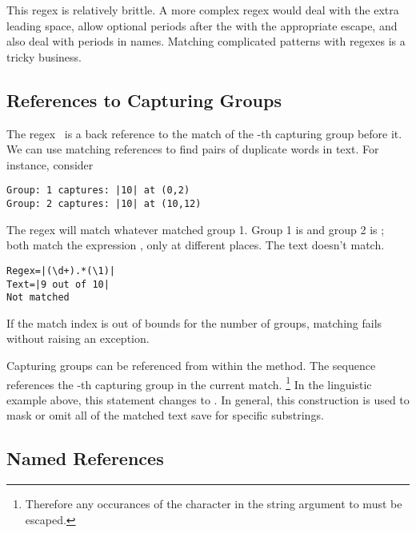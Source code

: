 This regex is relatively brittle.
A more complex regex would deal with the extra leading space, 
allow optional periods after the  with the
appropriate escape, and also deal with periods in names.
Matching complicated patterns with regexes is a tricky business.

\subsection{References to Capturing Groups}\label{section:regex-back-references}

The regex \, is a back reference to the match of
the -th capturing group before it.  We can use matching
references to find pairs of duplicate words in text.  For instance,
consider
%
\begin{verbatim}
Group: 1 captures: |10| at (0,2)
Group: 2 captures: |10| at (10,12)
\end{verbatim}
% 
The regex  will match whatever matched group 1.  
Group 1 is  and group 2 is ; both
match the expression , only at different places.
The text  doesn't match.
%
\begin{verbatim} 
Regex=|(\d+).*(\1)|
Text=|9 out of 10|
Not matched
\end{verbatim}
%
If the match index is out of bounds for the number of groups, matching
fails without raising an exception.

Capturing groups can be referenced from within the 
method.
The sequence  references the -th capturing group
in the current match.%
%
\footnote{Therefore any occurances of the character \stringmention{\$}
in the string argument to  must be escaped.}
%
%
In the linguistic example above, this statement changes
 to .
In general, this construction is used to mask or omit all
of the matched text save for specific substrings.

\subsection{Named References}\label{section:regex-named-references}

